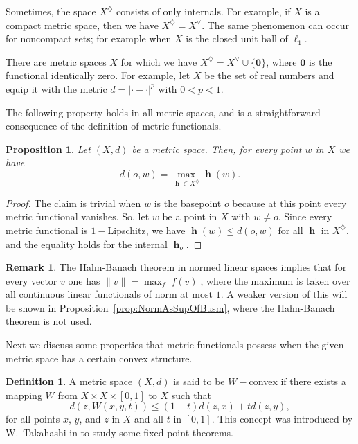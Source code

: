 \documentclass[a4paper,12pt]{article}
\newtheorem{prop}[thm]{Proposition}
\theoremstyle{definition}
\newtheorem{rem}[thm]{Remark}
\newtheorem{defn}[thm]{Definition}
\DeclareMathOperator{\h}{\mathbf{h}}
\newcommand{\abs}[1]{\lvert#1\rvert}
\newcommand{\norm}[1]{\lVert#1\rVert}
\numberwithin{equation}{section}
\begin{document}
Sometimes, the space $X^\diamondsuit$ consists of only internals. For example, 
if $X$ is a compact metric space, then we have $X^\diamondsuit = X^\vee$. The 
same phenomenon can occur for noncompact sets; for example when $X$ is the 
closed unit ball of $\ell_1$. 

There are metric spaces $X$ for which we have 
$X^\diamondsuit = X^\vee\cup\{\mathbf{0}\}$, where $\mathbf{0}$ is the functional
identically zero. For example, let $X$ be the set of real numbers and equip it 
with the metric $d=\abs{\cdot-\cdot}^p$ with $0<p<1$.

The following property holds in all metric spaces, and is a straightforward 
consequence of the definition of metric functionals.

\begin{prop}
Let $(X,d)$ be a metric space. Then, for every point $w$ in $X$ we have 
$$
	d(o,w)=\max_{\h\in X^\diamondsuit}\h(w).
$$
\end{prop}

\begin{proof}
The claim is trivial when $w$ is the basepoint $o$ because at this point every 
metric functional vanishes. So, let $w$ be a point in $X$ with $w\neq o$. Since 
every metric functional is $1-$Lipschitz, we have $\h(w) \leq d(o,w)$ for all 
$\h$ in $X^\diamondsuit$, and the equality holds for the internal $\h_o$.
\end{proof}

\begin{rem}
The Hahn-Banach theorem in normed linear spaces implies that for every vector $v$ 
one has $\norm{v}=\max_{f}\abs{f(v)}$, where the maximum is taken over all 
continuous linear functionals of norm at most $1$. A weaker version of this will 
be shown in Proposition~\ref{prop:NormAsSupOfBusm}, where the Hahn-Banach theorem 
is not used.
\end{rem}

Next we discuss some properties that metric functionals possess when the given 
metric space has a certain convex structure.

\begin{defn}\label{def:TakahashiConv}
A metric space $(X,d)$ is said to be $W-$convex if there exists a mapping $W$ 
from $X\times X\times[0,1]$ to $X$ such that 
$$
	d(z,W(x,y,t)) \leq (1-t)d(z,x) + td(z,y),
$$ 
for all points $x$, $y$, and $z$ in $X$ and all $t$ in $[0,1]$. This concept was 
introduced by W.~Takahashi in \cite{Takahashi1970} to study some fixed point 
theorems.
\end{defn}
\end{document}
